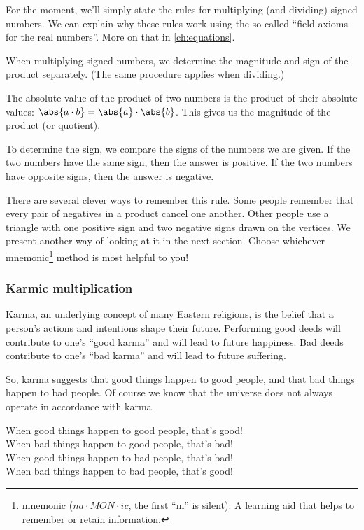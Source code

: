 For the moment, we'll simply state the rules for multiplying (and dividing) signed numbers. We can explain why these rules work using the so-called ``field axioms for the real numbers''. More on that in \cref{ch:equations}.

\begin{boxdef}
When multiplying signed numbers, we determine the magnitude and sign of the product separately. (The same procedure applies when dividing.)

The absolute value of the product of two numbers is the product of their absolute values: $\abs{a \cdot b} = \abs{a} \cdot \abs{b}$. This gives us the magnitude of the product (or quotient).

To determine the sign, we compare the signs of the numbers we are given. If the two numbers have the same sign, then the answer is positive. If the two numbers have opposite signs, then the answer is negative.
\end{boxdef}

There are several clever ways to remember this rule. Some people remember that every pair of negatives in a product cancel one another. Other people use a triangle with one positive sign and two negative signs drawn on the vertices. We present another way of looking at it in the next section. Choose whichever mnemonic\footnote{mnemonic ($na \cdot MON \cdot ic$, the first ``m'' is silent): A learning aid that helps to remember or retain information.} method is most helpful to you!

\subsubsection{Karmic multiplication}

Karma, an underlying concept of many Eastern religions, is the belief that a person's actions and intentions shape their future. Performing good deeds will contribute to one's ``good karma'' and will lead to future happiness. Bad deeds contribute to one's ``bad karma'' and will lead to future suffering.

So, karma suggests that good things happen to good people, and that bad things happen to bad people. Of course we know that the universe does not always operate in accordance with karma.

\begin{boxdef}
When good things happen to good people, that's good!
\\
When bad things happen to good people, that's bad!
\\
When good things happen to bad people, that's bad!
\\
When bad things happen to bad people, that's good!
\end{boxdef}

